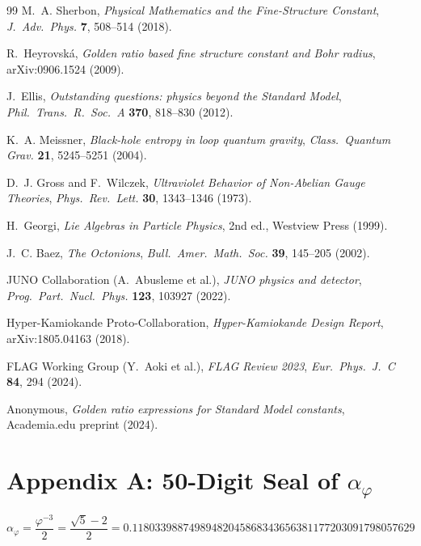 \documentclass[10pt,a4paper]{article}
\begin{document}
\begin{thebibliography}{99}
M.~A. Sherbon,
\textit{Physical Mathematics and the Fine-Structure Constant},
\textit{J.\ Adv.\ Phys.} \textbf{7}, 508--514 (2018).

R.~Heyrovsk\'{a},
\textit{Golden ratio based fine structure constant and Bohr radius},
arXiv:0906.1524 (2009).

J.~Ellis,
\textit{Outstanding questions: physics beyond the Standard Model},
\textit{Phil.\ Trans.\ R.\ Soc.\ A} \textbf{370}, 818--830 (2012).

K.~A. Meissner,
\textit{Black-hole entropy in loop quantum gravity},
\textit{Class.\ Quantum Grav.} \textbf{21}, 5245--5251 (2004).

D.~J. Gross and F.~Wilczek,
\textit{Ultraviolet Behavior of Non-Abelian Gauge Theories},
\textit{Phys.\ Rev.\ Lett.} \textbf{30}, 1343--1346 (1973).

H.~Georgi,
\textit{Lie Algebras in Particle Physics}, 2nd ed.,
Westview Press (1999).

J.~C. Baez,
\textit{The Octonions},
\textit{Bull.\ Amer.\ Math.\ Soc.} \textbf{39}, 145--205 (2002).

JUNO Collaboration (A.~Abusleme et al.),
\textit{JUNO physics and detector},
\textit{Prog.\ Part.\ Nucl.\ Phys.} \textbf{123}, 103927 (2022).

Hyper-Kamiokande Proto-Collaboration,
\textit{Hyper-Kamiokande Design Report},
arXiv:1805.04163 (2018).

FLAG Working Group (Y.~Aoki et al.),
\textit{FLAG Review 2023},
\textit{Eur.\ Phys.\ J.\ C} \textbf{84}, 294 (2024).

Anonymous,
\textit{Golden ratio expressions for Standard Model constants},
Academia.edu preprint (2024).

\end{thebibliography}

\appendix
\section*{Appendix A: 50-Digit Seal of $\alpha_\varphi$}

\begin{equation}
  \alpha_\varphi = \frac{\varphi^{-3}}{2} = \frac{\sqrt{5} - 2}{2}
  = 0.11803398874989482045868343656381177203091798057629
  \label{eq:seal}
\end{equation}
\end{document}
